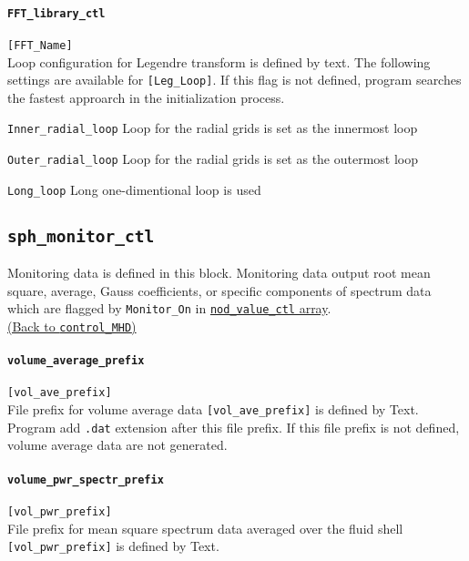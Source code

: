 \paragraph{\tt FFT\_library\_ctl}
\label{href_t:Legendre_trans_loop_ctl}
\verb|[FFT_Name]| \\
Loop configuration for Legendre transform is defined by text. The following settings are available for \verb|[Leg_Loop]|. 
If this flag is not defined, program searches the fastest approarch in the initialization process.
%
\begin{description}
\item{\tt Inner\_radial\_loop}	Loop for the radial grids is set as the innermost loop
\item{\tt Outer\_radial\_loop}	Loop for the radial grids is set as the outermost loop
\item{\tt Long\_loop}	        Long one-dimentional loop is used
\end{description}
%

\subsection{\tt sph\_monitor\_ctl}
\label{href_t:sph_monitor_ctl}
Monitoring data is defined in this block. Monitoring data output root mean square, average, Gauss coefficients, or specific components of spectrum data which are flagged by {\tt Monitor\_On} in \hyperref[href_t:nod_value_ctl]{ {\tt nod\_value\_ctl} array}. \\
\hyperref[href_i:sph_monitor_ctl]{(Back to {\tt control\_MHD})}

\paragraph{\tt volume\_average\_prefix}
\label{href_t:volume_average_prefix}
\verb|[vol_ave_prefix]| \\
File prefix for volume average data \verb|[vol_ave_prefix]| is defined by Text. Program add {\tt .dat} extension after this file prefix. If this file prefix is not defined, volume average data are not generated. 

\paragraph{\tt volume\_pwr\_spectr\_prefix}
\label{href_t:volume_pwr_spectr_prefix}
\verb|[vol_pwr_prefix]| \\
File prefix for mean square spectrum data averaged over the fluid shell \verb|[vol_pwr_prefix]| is defined by Text. 

